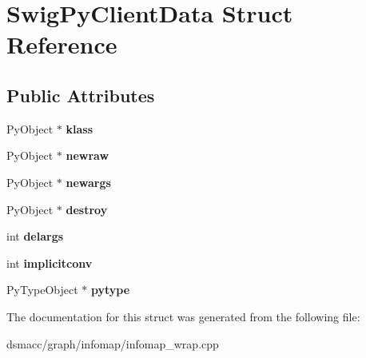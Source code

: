 \hypertarget{structSwigPyClientData}{}\section{Swig\+Py\+Client\+Data Struct Reference}
\label{structSwigPyClientData}
\subsection*{Public Attributes}
\begin{DoxyCompactItemize}
\item 
\mbox{\label{structSwigPyClientData_a482d64908147c310a56d1541476079dc}} 
Py\+Object $\ast$ {\bfseries klass}
\item 
\mbox{\label{structSwigPyClientData_a4da9e7723a1319cb42cda4ad186f65a3}} 
Py\+Object $\ast$ {\bfseries newraw}
\item 
\mbox{\label{structSwigPyClientData_a8f6dacca2c445f175d622fb9264e3715}} 
Py\+Object $\ast$ {\bfseries newargs}
\item 
\mbox{\label{structSwigPyClientData_a1c4e62712f23db599e85e24e14818d59}} 
Py\+Object $\ast$ {\bfseries destroy}
\item 
\mbox{\label{structSwigPyClientData_a9cb4b9b02743d09dbe216f304e2b7df0}} 
int {\bfseries delargs}
\item 
\mbox{\label{structSwigPyClientData_a5f9ebdbc04a774559a64b926b6ec4070}} 
int {\bfseries implicitconv}
\item 
\mbox{\label{structSwigPyClientData_a1f172e51bb27f670dacdf8247843b4c2}} 
Py\+Type\+Object $\ast$ {\bfseries pytype}
\end{DoxyCompactItemize}


The documentation for this struct was generated from the following file\+:\begin{DoxyCompactItemize}
\item 
dsmacc/graph/infomap/infomap\+\_\+wrap.\+cpp\end{DoxyCompactItemize}
